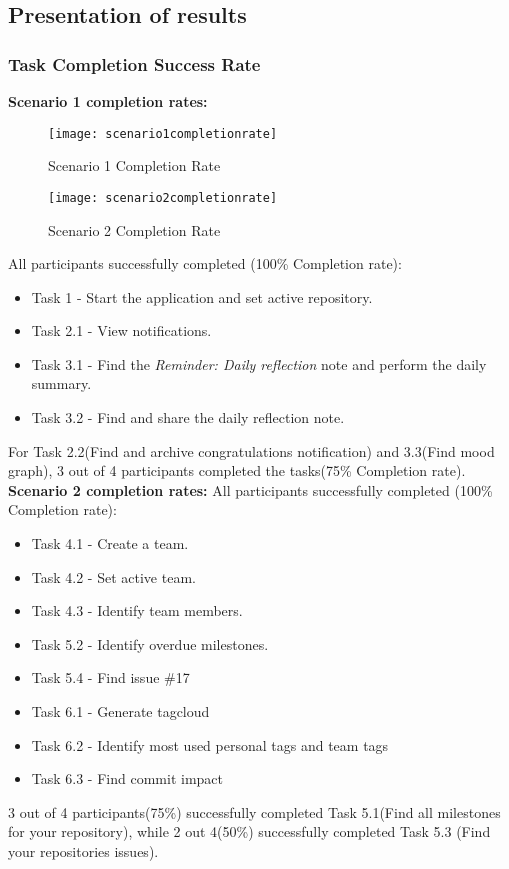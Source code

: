 \subsection{Presentation of results}
\subsubsection{Task Completion Success Rate}
\textbf{Scenario 1 completion rates:}
\begin{figure}[h!]
    \centering
        \texttt{[image: scenario1completionrate]}
    \caption{Scenario 1 Completion Rate}
    \label{scenario1completionrate}
\end{figure}
\begin{figure}[h!]
    \centering
        \texttt{[image: scenario2completionrate]}
    \caption{Scenario 2 Completion Rate}
    \label{scenario2completionrate}
\end{figure}
All participants successfully completed (100\% Completion rate):
\begin{itemize}
	\item Task 1 - Start the application and set active repository. 
	\item Task 2.1 - View notifications. 
	\item Task 3.1 - Find the \emph{Reminder: Daily reflection} note and perform the daily summary. 
	\item Task 3.2 - Find and share the daily reflection note.
\end{itemize}
For Task 2.2(Find and archive congratulations notification) and 3.3(Find mood graph), 3 out of 4 participants completed the tasks(75\% Completion rate). \\

\textbf{Scenario 2 completion rates:}
All participants successfully completed (100\% Completion rate):
\begin{itemize}
	\item Task 4.1 - Create a team. 
	\item Task 4.2 - Set active team. 
	\item Task 4.3 - Identify team members. 
	\item Task 5.2 - Identify overdue milestones. 
	\item Task 5.4 - Find issue \#17
	\item Task 6.1 - Generate tagcloud
	\item Task 6.2 - Identify most used personal tags and team tags
	\item Task 6.3 - Find commit impact
\end{itemize}
3 out of 4 participants(75\%) successfully completed Task 5.1(Find all milestones for your repository), while 2 out 4(50\%) successfully completed Task 5.3 (Find your repositories issues). 

